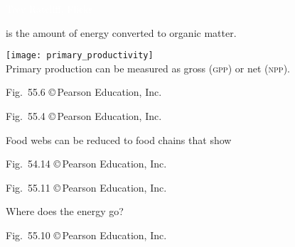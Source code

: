 \documentclass[t]{beamer}
\begin{document}
%
{
\begin{frame}[b]

	\hfill \tiny \textcolor{white}{Trey Ratcliff, Flickr }
\end{frame}
}
%
{
\begin{frame}[t]{ is the amount of energy converted to organic matter.}

	\vspace*{-0.5\baselineskip}
	
	\texttt{[image: primary\_productivity]}\\[\baselineskip]
	
	Primary production can be measured as gross (\textsc{gpp}) or net (\textsc{npp}).

	\vfilll
	
	\hfill \tiny Fig.~55.6 \copyright\,Pearson Education, Inc.
\end{frame}
}
%
{
\begin{frame}[b]

	\hfill \tiny Fig.~55.4 \copyright\,Pearson Education, Inc.

\end{frame}
}
%
{
\begin{frame}{}
\hspace{65mm}\begin{minipage}{0.45\textwidth}
	\flushleft
	\vspace{4\baselineskip}
	Food webs can be reduced to food chains that show 
\end{minipage}
\end{frame}
}
{
\begin{frame}[b]

	\hfill \tiny Fig.~54.14 \copyright\,Pearson Education, Inc.

\end{frame}
}
%
{
\begin{frame}[b]

	\hfill \tiny Fig.~55.11 \copyright\,Pearson Education, Inc.
\end{frame}
}
%
{
\begin{frame}[b]{Where does the energy go?}

	\hfill \tiny Fig.~55.10 \copyright\,Pearson Education, Inc.
\end{frame}
}
\end{document}

